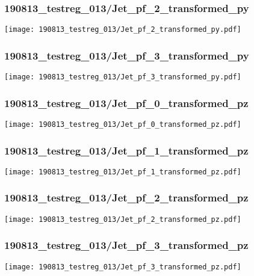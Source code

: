 \begin{frame}
   \frametitle{\small 190813\_testreg\_013/Jet\_pf\_2\_transformed\_py}
   \centering
   \texttt{[image: 190813\_testreg\_013/Jet\_pf\_2\_transformed\_py.pdf]}
\end{frame}

\begin{frame}
   \frametitle{\small 190813\_testreg\_013/Jet\_pf\_3\_transformed\_py}
   \centering
   \texttt{[image: 190813\_testreg\_013/Jet\_pf\_3\_transformed\_py.pdf]}
\end{frame}

\begin{frame}
   \frametitle{\small 190813\_testreg\_013/Jet\_pf\_0\_transformed\_pz}
   \centering
   \texttt{[image: 190813\_testreg\_013/Jet\_pf\_0\_transformed\_pz.pdf]}
\end{frame}

\begin{frame}
   \frametitle{\small 190813\_testreg\_013/Jet\_pf\_1\_transformed\_pz}
   \centering
   \texttt{[image: 190813\_testreg\_013/Jet\_pf\_1\_transformed\_pz.pdf]}
\end{frame}

\begin{frame}
   \frametitle{\small 190813\_testreg\_013/Jet\_pf\_2\_transformed\_pz}
   \centering
   \texttt{[image: 190813\_testreg\_013/Jet\_pf\_2\_transformed\_pz.pdf]}
\end{frame}

\begin{frame}
   \frametitle{\small 190813\_testreg\_013/Jet\_pf\_3\_transformed\_pz}
   \centering
   \texttt{[image: 190813\_testreg\_013/Jet\_pf\_3\_transformed\_pz.pdf]}
\end{frame}

